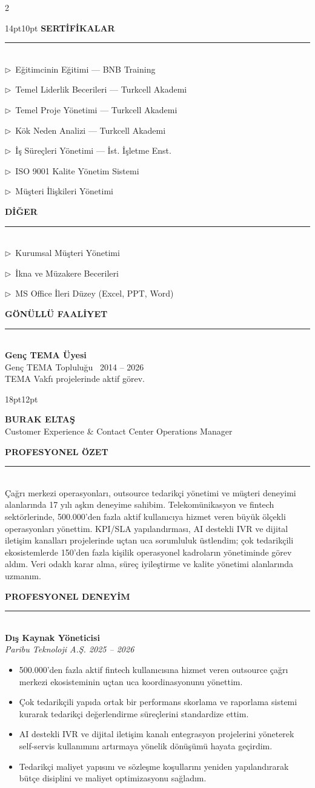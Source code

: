 \documentclass[10pt,a4paper]{article}
\newcommand{\profilOzet}{%
Çağrı merkezi operasyonları, outsource tedarikçi yönetimi ve müşteri
deneyimi alanlarında 17 yılı aşkın deneyime sahibim. Telekomünikasyon ve
fintech sektörlerinde, 500.000'den fazla aktif kullanıcıya hizmet veren
büyük ölçekli operasyonları yönettim. KPI/SLA yapılandırması, AI destekli
IVR ve dijital iletişim kanalları projelerinde uçtan uca sorumluluk
üstlendim; çok tedarikçili ekosistemlerde 150'den fazla kişilik operasyonel
kadroların yönetiminde görev aldım. Veri odaklı karar alma, süreç
iyileştirme ve kalite yönetimi alanlarında uzmanım.%
}
\newcommand{\hedefUnvan}{Customer Experience \& Contact Center Operations Manager}
\newcommand{\sidebarSection}[1]{%
  \vspace{10pt}
  {\color{accent}\bfseries\fontsize{10}{12}\selectfont #1}\\[2pt]
  {\color{white!40!sidebarbg}\rule{\linewidth}{0.4pt}}\\[4pt]
}
\newcommand{\sidebarItem}[1]{{\color{white}\small $\triangleright$~#1}\par\vspace{2pt}}
\newcommand{\mainSection}[1]{%
  \vspace{8pt}
  {\color{darktext}\bfseries\fontsize{12}{14}\selectfont #1}\\
  {\color{accent}\rule{\linewidth}{1pt}}\\[4pt]
}
\newcommand{\job}[4]{%
  {\color{darktext}\bfseries #1}\\
  {\color{accent}\itshape #2 \hfill #3}\\[2pt]
  \begin{itemize}[leftmargin=12pt,itemsep=1pt,topsep=2pt,label=\textcolor{accent}{$\blacktriangleright$}]
  #4
  \end{itemize}
  \vspace{4pt}
}
\begin{document}
\begin{paracol}{2}
\begin{leftcolumn}
\begin{adjustwidth}{14pt}{10pt}
\sidebarSection{SERTİFİKALAR}
\sidebarItem{Eğitimcinin Eğitimi --- BNB Training}
\sidebarItem{Temel Liderlik Becerileri --- Turkcell Akademi}
\sidebarItem{Temel Proje Yönetimi --- Turkcell Akademi}
\sidebarItem{Kök Neden Analizi --- Turkcell Akademi}
\sidebarItem{İş Süreçleri Yönetimi --- İst. İşletme Enst.}
\sidebarItem{ISO 9001 Kalite Yönetim Sistemi}
\sidebarItem{Müşteri İlişkileri Yönetimi}

\sidebarSection{DİĞER}
\sidebarItem{Kurumsal Müşteri Yönetimi}
\sidebarItem{İkna ve Müzakere Becerileri}
\sidebarItem{MS Office İleri Düzey (Excel, PPT, Word)}

\sidebarSection{GÖNÜLLÜ FAALİYET}
{\color{white}\small\bfseries Genç TEMA Üyesi}\\
{\color{white!85!black}\small Genç TEMA Topluluğu \textbar\ 2014 -- 2026}\\
{\color{white!70!black}\small TEMA Vakfı projelerinde aktif görev.}

\vspace{20pt}
\end{adjustwidth}
\end{leftcolumn}

\begin{rightcolumn}
\begin{adjustwidth}{18pt}{12pt}
\vspace*{24pt}

{\color{darktext}\bfseries\fontsize{22}{24}\selectfont BURAK ELTAŞ}\\[2pt]
{\color{accent}\fontsize{12}{14}\selectfont \hedefUnvan}

\mainSection{PROFESYONEL ÖZET}
{\small\color{bodytext}\profilOzet}

\mainSection{PROFESYONEL DENEYİM}

\job{Dış Kaynak Yöneticisi}{Paribu Teknoloji A.Ş.}{2025 -- 2026}{%
\item 500.000'den fazla aktif fintech kullanıcısına hizmet veren outsource çağrı merkezi ekosisteminin uçtan uca koordinasyonunu yönettim.
\item Çok tedarikçili yapıda ortak bir performans skorlama ve raporlama sistemi kurarak tedarikçi değerlendirme süreçlerini standardize ettim.
\item AI destekli IVR ve dijital iletişim kanalı entegrasyon projelerini yöneterek self-servis kullanımını artırmaya yönelik dönüşümü hayata geçirdim.
\item Tedarikçi maliyet yapısını ve sözleşme koşullarını yeniden yapılandırarak bütçe disiplini ve maliyet optimizasyonu sağladım.
}


\end{adjustwidth}
\end{rightcolumn}
\end{paracol}
\end{document}

